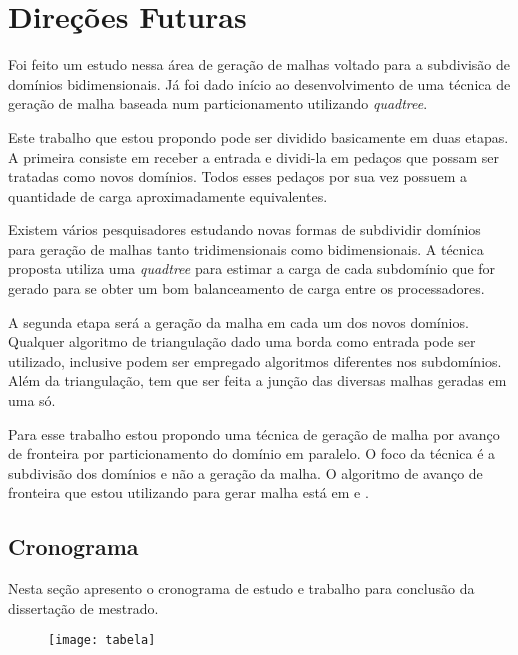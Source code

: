 \pagestyle{empty}
\cleardoublepage
\pagestyle{fancy}
\chapter{Direções Futuras}\label{cap4}

Foi feito um estudo nessa área de geração de malhas voltado para a subdivisão de domínios bidimensionais. Já foi dado início ao desenvolvimento de uma técnica de geração de malha baseada num particionamento utilizando \textit{quadtree}.

Este trabalho que estou propondo pode ser dividido basicamente em duas etapas. A primeira consiste em receber a entrada e dividi-la em pedaços que possam ser tratadas como novos domínios. Todos esses pedaços por sua vez possuem a quantidade de carga aproximadamente equivalentes.

Existem vários pesquisadores estudando novas formas de subdividir domínios para geração de malhas tanto tridimensionais como bidimensionais. A técnica proposta utiliza uma \textit{quadtree} para estimar a carga de cada subdomínio que for gerado para se obter um bom balanceamento de carga entre os processadores.

A segunda etapa será a geração da malha em cada um dos novos domínios. Qualquer algoritmo de triangulação dado uma borda como entrada pode ser utilizado, inclusive podem ser empregado algoritmos diferentes nos subdomínios. Além da triangulação, tem que ser feita a junção das diversas malhas geradas em uma só.

Para esse trabalho estou propondo uma técnica de geração de malha por avanço de fronteira por particionamento do domínio em paralelo. O foco da técnica é a subdivisão dos domínios e não a geração da malha. O algoritmo de avanço de fronteira que estou utilizando para gerar malha está em \cite{bib:Miranda99} e \cite{bib:Cavalcante-Neto01}.

\section{Cronograma}
Nesta seção apresento o cronograma de estudo e trabalho para conclusão da dissertação de mestrado.

 \begin{figure}[htbp]
     \begin{center}
     \texttt{[image: tabela]}
     \label{fig:tabela}
     \end{center}
 \end{figure}